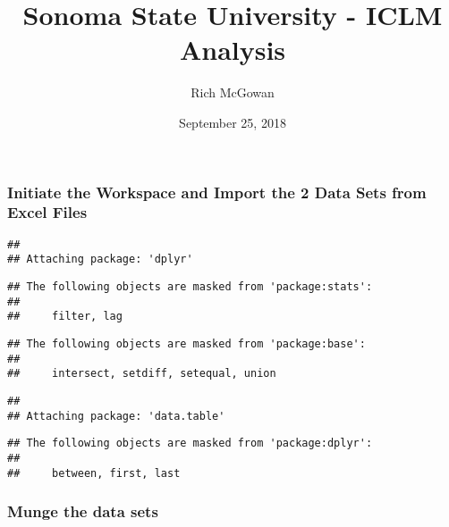 \documentclass[]{article}
\title{Sonoma State University - ICLM Analysis}
\author{Rich McGowan}
\date{September 25, 2018}
\begin{document}
\maketitle

\subsubsection{Initiate the Workspace and Import the 2 Data Sets from
Excel
Files}\label{initiate-the-workspace-and-import-the-2-data-sets-from-excel-files}

\begin{verbatim}
## 
## Attaching package: 'dplyr'
\end{verbatim}

\begin{verbatim}
## The following objects are masked from 'package:stats':
## 
##     filter, lag
\end{verbatim}

\begin{verbatim}
## The following objects are masked from 'package:base':
## 
##     intersect, setdiff, setequal, union
\end{verbatim}

\begin{verbatim}
## 
## Attaching package: 'data.table'
\end{verbatim}

\begin{verbatim}
## The following objects are masked from 'package:dplyr':
## 
##     between, first, last
\end{verbatim}

\subsubsection{Munge the data sets}\label{munge-the-data-sets}
\end{document}
